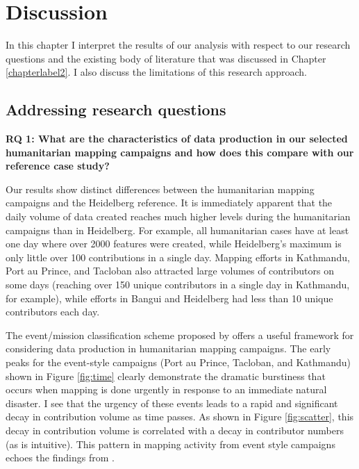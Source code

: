 \chapter{Discussion}
\label{chapterlabel6}

In this chapter I interpret the results of our analysis with respect to our research questions and the existing body of literature that was discussed in Chapter \ref{chapterlabel2}. I also discuss the limitations of this research approach. 

\section{Addressing research questions}

\noindent\textbf{RQ 1: What are the characteristics of data production in our selected humanitarian mapping campaigns and how does this compare with our reference case study?} 

Our results show distinct differences between the humanitarian mapping campaigns and the Heidelberg reference. It is immediately apparent that the daily volume of data created reaches much higher levels during the humanitarian campaigns than in Heidelberg. For example, all humanitarian cases have at least one day where over 2000 features were created, while Heidelberg's maximum is only little over 100 contributions in a single day. Mapping efforts in Kathmandu, Port au Prince, and Tacloban also attracted large volumes of contributors on some days (reaching over 150 unique contributors in a single day in Kathmandu, for example), while efforts in Bangui and Heidelberg had less than 10 unique contributors each day. 

The event/mission classification scheme proposed by \textcite{dittus_mass_2017} offers a useful framework for considering data production in humanitarian mapping campaigns. The early peaks for the event-style campaigns (Port au Prince, Tacloban, and Kathmandu) shown in Figure \ref{fig:time} clearly demonstrate the dramatic burstiness that occurs when mapping is done urgently in response to an immediate natural disaster. I see that the urgency of these events leads to a rapid and significant decay in contribution volume as time passes. As shown in Figure \ref{fig:scatter}, this decay in contribution volume is correlated with a decay in contributor numbers (as is intuitive). This pattern in mapping activity from event style campaigns echoes the findings from \textcite[p. 1294]{dittus_mass_2017}.


